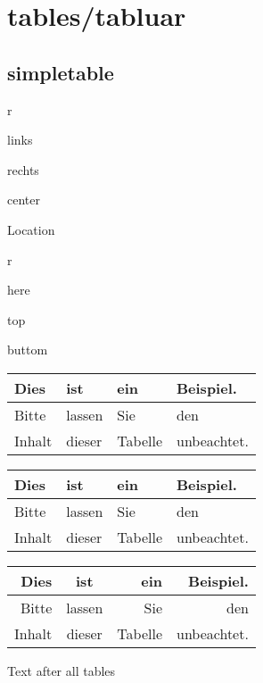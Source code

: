 \chapter{tables/tabluar}
\section{simpletable}

\begin{labeling}[ --]{r}
	\item[l] links
	\item[r] rechts
	\item[c] center
\end{labeling}

Location

\begin{labeling}[ --]{r}
	\item[h] here
	\item[t] top
	\item[b] buttom
\end{labeling}


\begin{table}[h]
	\begin{tabular}{l|lll}
		Dies & ist & ein & Beispiel.\\
		\hline
		Bitte & lassen & Sie & den \\
		Inhalt & dieser & Tabelle & unbeachtet.
	\end{tabular}
\end{table}

\begin{table}[t]
	\begin{tabular}{l|lll}
		Dies & ist & ein & Beispiel.\\
		\hline
		Bitte & lassen & Sie & den \\
		Inhalt & dieser & Tabelle & unbeachtet.
	\end{tabular}
\end{table}

\begin{table}[b]
	\begin{tabular}{rcrr}
		Dies & ist & ein & Beispiel.\\
		\hline
		Bitte & lassen & Sie & den \\
		Inhalt & dieser & Tabelle & unbeachtet.
	\end{tabular}
\end{table}

Text after all tables